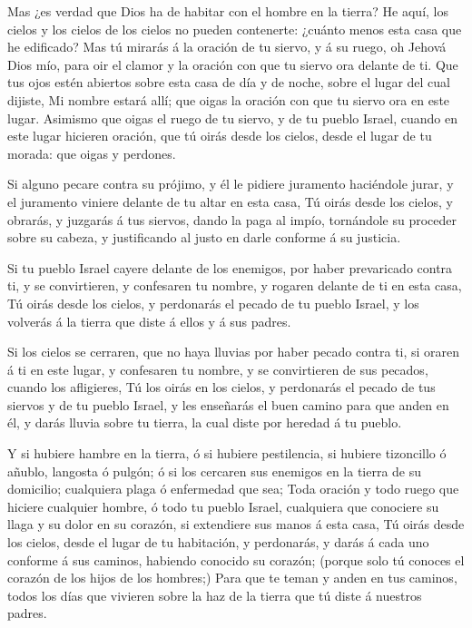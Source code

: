  Mas ¿es verdad que Dios ha de habitar con el hombre en la
tierra? He aquí, los cielos y los cielos de los cielos no pueden
contenerte: ¿cuánto menos esta casa que he edificado?  Mas
tú mirarás á la oración de tu siervo, y á su ruego, oh Jehová Dios mío,
para oir el clamor y la oración con que tu siervo ora delante de ti.
 Que tus ojos estén abiertos sobre esta casa de día y de
noche, sobre el lugar del cual dijiste, Mi nombre estará allí; que oigas
la oración con que tu siervo ora en este lugar.  Asimismo
que oigas el ruego de tu siervo, y de tu pueblo Israel, cuando en este
lugar hicieren oración, que tú oirás desde los cielos, desde el lugar de
tu morada: que oigas y perdones.

 Si alguno pecare contra su prójimo, y él le pidiere
juramento haciéndole jurar, y el juramento viniere delante de tu altar
en esta casa,  Tú oirás desde los cielos, y obrarás, y
juzgarás á tus siervos, dando la paga al impío, tornándole su proceder
sobre su cabeza, y justificando al justo en darle conforme á su
justicia.

 Si tu pueblo Israel cayere delante de los enemigos, por
haber prevaricado contra ti, y se convirtieren, y confesaren tu nombre,
y rogaren delante de ti en esta casa,  Tú oirás desde los
cielos, y perdonarás el pecado de tu pueblo Israel, y los volverás á la
tierra que diste á ellos y á sus padres.

 Si los cielos se cerraren, que no haya lluvias por haber
pecado contra ti, si oraren á ti en este lugar, y confesaren tu nombre,
y se convirtieren de sus pecados, cuando los afligieres, 
Tú los oirás en los cielos, y perdonarás el pecado de tus siervos y de
tu pueblo Israel, y les enseñarás el buen camino para que anden en él, y
darás lluvia sobre tu tierra, la cual diste por heredad á tu pueblo.

 Y si hubiere hambre en la tierra, ó si hubiere
pestilencia, si hubiere tizoncillo ó añublo, langosta ó pulgón; ó si los
cercaren sus enemigos en la tierra de su domicilio; cualquiera plaga ó
enfermedad que sea;  Toda oración y todo ruego que hiciere
cualquier hombre, ó todo tu pueblo Israel, cualquiera que conociere su
llaga y su dolor en su corazón, si extendiere sus manos á esta casa,
 Tú oirás desde los cielos, desde el lugar de tu
habitación, y perdonarás, y darás á cada uno conforme á sus caminos,
habiendo conocido su corazón; (porque solo tú conoces el corazón de los
hijos de los hombres;)  Para que te teman y anden en tus
caminos, todos los días que vivieren sobre la haz de la tierra que tú
diste á nuestros padres.

